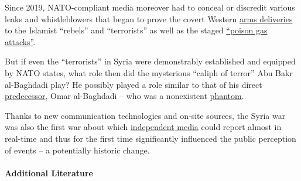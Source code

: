 Since 2019, NATO-compliant media moreover had to conceal or discredit
various leaks and whistleblowers that began to prove the covert Western
\href{https://armswatch.com/350-diplomatic-flights-carry-weapons-for-terrorists/}{arms
deliveries} to the Islamist ``rebels'' and ``terrorists'' as well as the
staged
\href{https://thegrayzone.com/2020/02/11/new-leaks-shatter-opcws-attacks-douma-whistleblowers/}{``poison
gas attacks''}.

But if even the ``terrorists'' in Syria were demonstrably established
and equipped by NATO states, what role then did the mysterious ``caliph
of terror'' Abu Bakr al-Baghdadi play? He possibly played a role similar
to that of his direct
\href{https://en.wikipedia.org/wiki/Abu_Omar_al-Baghdadi}{predecessor},
Omar al-Baghdadi -- who was a nonexistent
\href{https://www.nytimes.com/2007/07/18/world/africa/18iht-iraq.4.6718200.html}{phantom}.

Thanks to new communication technologies and on-site sources, the Syria
war was also the first war about which
\href{https://swprs.org/media-navigator/}{independent media} could
report almost in real-time and thus for the first time significantly
influenced the public perception of events -- a potentially historic
change.

\hypertarget{additional-literature}{%
\paragraph{Additional Literature}\label{additional-literature}}

